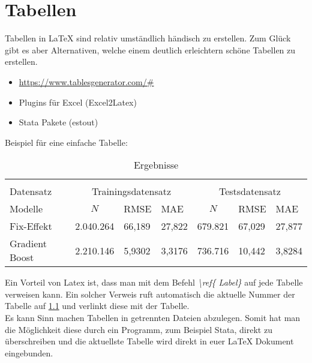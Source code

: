 
\chapter{Tabellen}
Tabellen in LaTeX sind relativ umständlich händisch zu erstellen. Zum Glück gibt es aber Alternativen, welche einem deutlich erleichtern schöne Tabellen zu erstellen.
\begin{itemize}
    \item \url{https://www.tablesgenerator.com/#}
    \item Plugins für Excel (Excel2Latex)
    \item Stata Pakete (estout)
\end{itemize}

Beispiel für eine einfache Tabelle:
\begin{table}[h]
\centering
\caption{Ergebnisse}
\label{tab:easy_table}
\begin{tabular}{l|lll|lll}
\hline\hline \multicolumn{4}{l}{} \\ [-10pt]
Datensatz & \multicolumn{3}{c|}{Trainingsdatensatz} & \multicolumn{3}{c}{Testsdatensatz} \\
Modelle &                \multicolumn{1}{c}{ $N$} &     RMSE &      MAE &           \multicolumn{1}{c}{ $N$}&      RMSE &      MAE \\
\midrule
Fix-Effekt              &           2.040.264 & 66,189     &     27,822 &    679.821 & 67,029 & 27,877 \\
Gradient Boost    &           2.210.146 & 5,9302     &     3,3176 &    736.716 & 10,442 &  3,8284 \\
\hline\hline 
\end{tabular}

\end{table}

Ein Vorteil von Latex ist, dass man mit dem Befehl \emph{ \textbackslash ref\{ Label\} } auf jede Tabelle verweisen kann. Ein solcher Verweis ruft automatisch die aktuelle Nummer der Tabelle auf \ref{tab:easy_table} und verlinkt diese mit der Tabelle.\\
Es kann Sinn machen Tabellen in getrennten Dateien abzulegen. Somit hat man die Möglichkeit diese durch ein Programm, zum Beispiel Stata, direkt zu überschreiben und die aktuellste Tabelle wird direkt in euer LaTeX Dokument eingebunden.